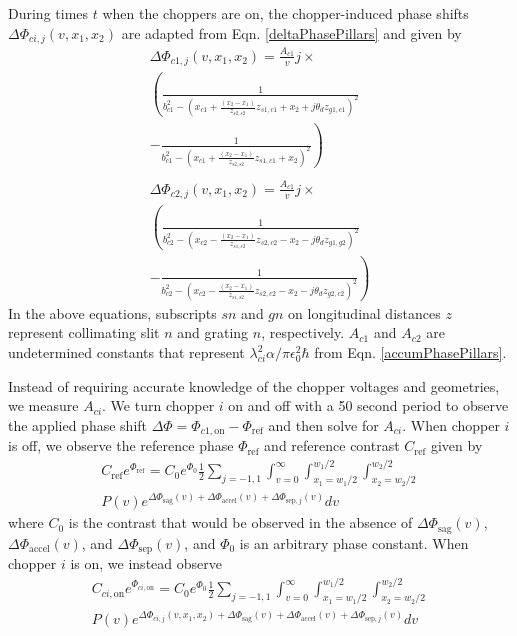 \documentclass[twocolumn,prl,showpacs,superscriptaddress]{revtex4-1}   %
\newcommand{\eqnref}[1]{Eqn. \eqref{#1}}
\newcommand{\dphisep}{\Delta\Phi_{\mathrm{sep}}}
\newcommand{\dphisepj}{\Delta\Phi_{\mathrm{sep},j}}
\newcommand{\dphisag}{\Delta\Phi_{\mathrm{sag}}}
\newcommand{\dphiaccel}{\Delta\Phi_{\mathrm{accel}}}
\begin{document}
During times $t$ when the choppers are on, the chopper-induced phase shifts $\Delta\Phi_{ci,j}(v,x_1,x_2)$ are adapted from \eqnref{deltaPhasePillars} and given by
\begin{align}
	\Delta\Phi_{c1,j}(v,x_1,x_2) = \frac{A_{c1}}{v}j \times \nonumber \\
	\left(
		\frac{1}{b_{c1}^2 -
			(x_{c1} + \frac{(x_2-x_1)}{z_{s2,s2}}z_{s1,c1} + x_2 + j\theta_d z_{g1,c1})^2
		}
		\right. \nonumber \\ - \left.
		\frac{1}{b_{c1}^2 -
			(x_{c1} + \frac{(x_2-x_1)}{z_{s2,s2}}z_{s1,c1} + x_2)^2
		}
	\right)
	\nonumber \\ 
	\nonumber \\	
	\Delta\Phi_{c2,j}(v,x_1,x_2) = \frac{A_{c1}}{v}j \times \nonumber \\
	\left(
		\frac{1}{b_{c2}^2 -
			(x_{c2} - \frac{(x_2-x_1)}{z_{s1,s2}}z_{s2,c2} - x_2 - j\theta_d z_{g1,g2})^2
		}
		\right. \nonumber \\ - \left.
		\frac{1}{b_{c2}^2 -
			(x_{c2} - \frac{(x_2-x_1)}{z_{s1,s2}}z_{s2,c2} - x_2 - j\theta_d z_{g2,c2})^2
		}
	\right)
	\label{phic1c2}
\end{align}
In the above equations, subscripts $sn$ and $gn$ on longitudinal distances $z$ represent collimating slit $n$ and grating $n$, respectively. $A_{c1}$ and $A_{c2}$ are undetermined constants that represent $\lambda_{ci}^2 \alpha / \pi \epsilon_0^2 \hbar$ from \eqnref{accumPhasePillars}. 

Instead of requiring accurate knowledge of the chopper voltages and geometries, we measure $A_{ci}$. We turn chopper $i$ on and off with a 50 second period to observe the applied phase shift $\Delta\Phi = \Phi_{c1,\mathrm{on}} - \Phi_{\mathrm{ref}}$ and then solve for $A_{ci}$. When chopper $i$ is off, we observe the reference phase $\Phi_{\mathrm{ref}}$ and reference contrast $C_{\mathrm{ref}}$ given by 
\begin{align}
	C_{\mathrm{ref}}e^{\Phi_{\mathrm{ref}}} = 
		C_0e^{\Phi_0} \frac{1}{2} \sum_{j=-1,1}
		\int_{v=0}^{\infty}
		\int_{x_1=w_1/2}^{w_1/2}
		\int_{x_2=w_2/2}^{w_2/2} 
		\nonumber \\
		P(v) e^{\dphisag(v) + \dphiaccel(v) + \dphisepj(v)} 
		dv
	\label{CPChoppersRef}
\end{align}
where $C_0$ is the contrast that would be observed in the absence of $\dphisag(v)$, $\dphiaccel(v)$, and $\dphisep(v)$, and $\Phi_0$ is an arbitrary phase constant. When chopper $i$ is on, we instead observe
\begin{align}
	C_{ci,\mathrm{on}}e^{\Phi_{ci,\mathrm{on}}} = 
		C_0e^{\Phi_0} \frac{1}{2} \sum_{j=-1,1}
		\int_{v=0}^{\infty}
		\int_{x_1=w_1/2}^{w_1/2}
		\int_{x_2=w_2/2}^{w_2/2} 
		\nonumber \\
		P(v) e^{\Delta\Phi_{ci,j}(v,x_1,x_2) + \dphisag(v) + \dphiaccel(v) + \dphisepj(v)} 
		dv
	\label{CPChoppersOn}
\end{align}
\end{document}
